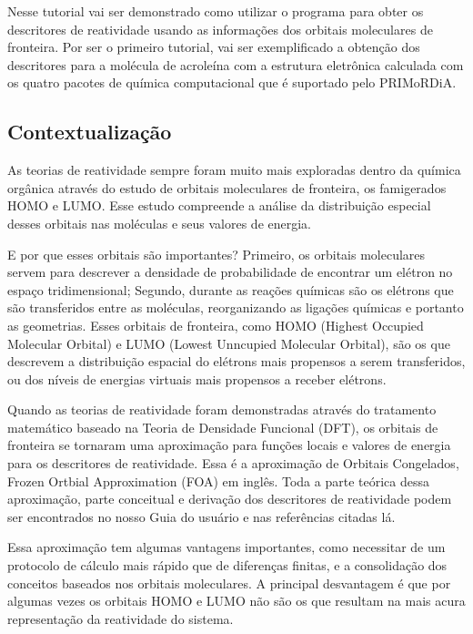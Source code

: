 \documentclass[a4paper,11pt]{refart}
\begin{document}
Nesse tutorial vai ser demonstrado como utilizar o programa para obter os descritores de reatividade usando as informações dos orbitais moleculares de fronteira. Por ser o primeiro tutorial, vai ser exemplificado a obtenção dos descritores para a molécula de acroleína com a estrutura eletrônica calculada com os quatro pacotes de química computacional que é suportado pelo PRIMoRDiA.

\subsection{Contextualização}

As teorias de reatividade sempre foram muito mais exploradas dentro da química orgânica através do estudo de orbitais moleculares de fronteira, os famigerados HOMO e LUMO. Esse estudo compreende a análise da distribuição especial desses orbitais nas moléculas e seus valores de energia.

E por que esses orbitais são importantes? Primeiro, os orbitais moleculares servem para descrever a densidade de probabilidade de encontrar um elétron no espaço tridimensional; Segundo, durante as reações químicas são os elétrons que são transferidos entre as moléculas, reorganizando as ligações químicas e portanto as geometrias. Esses orbitais de fronteira, como HOMO (Highest Occupied Molecular Orbital) e LUMO (Lowest Unncupied Molecular Orbital), são os que descrevem a distribuição espacial do elétrons mais propensos a serem transferidos, ou dos níveis de energias virtuais mais propensos a receber elétrons.

Quando as teorias de reatividade foram demonstradas através do tratamento matemático baseado na Teoria de Densidade Funcional (DFT), os orbitais de fronteira se tornaram uma aproximação para funções locais e valores de energia para os descritores de reatividade. Essa é a aproximação de Orbitais Congelados, Frozen Ortbial Approximation (FOA) em inglês. Toda a parte teórica dessa aproximação, parte conceitual e derivação dos descritores de reatividade podem ser encontrados no nosso Guia do usuário e nas referências citadas lá. 

Essa aproximação tem algumas vantagens importantes, como necessitar de um protocolo de cálculo mais rápido que de diferenças finitas, e a consolidação dos conceitos baseados nos orbitais moleculares. A principal desvantagem é que por algumas vezes os orbitais HOMO e LUMO não são os que resultam na mais acura representação da reatividade do sistema.
\end{document}
